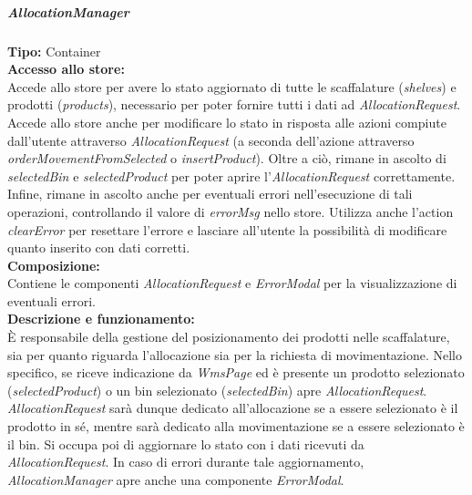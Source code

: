 \subparagraph{\colorbox{verde_uml}{AllocationManager}}
\textbf{Tipo:} Container \\
\textbf{Accesso allo store:} \\
Accede allo store per avere lo stato aggiornato di tutte le scaffalature (\textit{shelves}) e prodotti (\textit{products}), necessario per poter fornire tutti i dati ad \textit{AllocationRequest}. Accede allo store anche per modificare lo stato in risposta alle azioni compiute dall'utente attraverso \textit{AllocationRequest} (a seconda dell'azione attraverso \textit{orderMovementFromSelected} o \textit{insertProduct}). Oltre a ciò, rimane in ascolto di \textit{selectedBin} e \textit{selectedProduct} per poter aprire l'\textit{AllocationRequest} correttamente.
Infine, rimane in ascolto anche per eventuali errori nell'esecuzione di tali operazioni, controllando il valore di \textit{errorMsg} nello store. Utilizza anche l'action \textit{clearError} per resettare l'errore e lasciare all'utente la possibilità di modificare quanto inserito con dati corretti.\\
\textbf{Composizione:} \\
Contiene le componenti \textit{AllocationRequest} e \textit{ErrorModal} per la visualizzazione di eventuali errori.\\
\textbf{Descrizione e funzionamento:} \\
È responsabile della gestione del posizionamento dei prodotti nelle scaffalature, sia per quanto riguarda l'allocazione sia per la richiesta di movimentazione. 
Nello specifico, se riceve indicazione da \textit{WmsPage} ed è presente un prodotto selezionato (\textit{selectedProduct}) o un bin selezionato (\textit{selectedBin}) apre \textit{AllocationRequest}. \textit{AllocationRequest} sarà dunque dedicato all'allocazione se a essere selezionato è il prodotto in sé, mentre sarà dedicato alla movimentazione se a essere selezionato è il bin. Si occupa poi di aggiornare lo stato con i dati ricevuti da \textit{AllocationRequest}.
In caso di errori durante tale aggiornamento, \textit{AllocationManager} apre anche una componente \textit{ErrorModal}.


